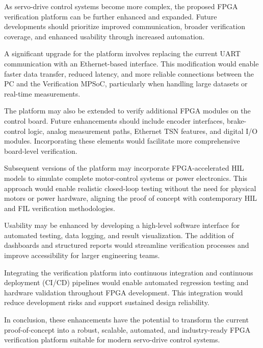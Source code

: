 As servo-drive control systems become more complex, the proposed \acs{FPGA} verification platform can be further enhanced and expanded. Future developments should prioritize improved communication, broader verification coverage, and enhanced usability through increased automation.

A significant upgrade for the platform involves replacing the current \acs{UART} communication with an Ethernet-based interface. This modification would enable faster data transfer, reduced latency, and more reliable connections between the PC and the Verification \acs{MPSoC}, particularly when handling large datasets or real-time measurements.

The platform may also be extended to verify additional \acs{FPGA} modules on the control board. Future enhancements should include encoder interfaces, brake-control logic, analog measurement paths, Ethernet \acs{TSN} features, and digital I/O modules. Incorporating these elements would facilitate more comprehensive board-level verification.

Subsequent versions of the platform may incorporate \acs{FPGA}-accelerated \acs{HIL} models to simulate complete motor-control systems or power electronics. This approach would enable realistic closed-loop testing without the need for physical motors or power hardware, aligning the proof of concept with contemporary \acs{HIL} and \acs{FIL} verification methodologies.

Usability may be enhanced by developing a high-level software interface for automated testing, data logging, and result visualization. The addition of dashboards and structured reports would streamline verification processes and improve accessibility for larger engineering teams.

Integrating the verification platform into continuous integration and continuous deployment (CI/CD) pipelines would enable automated regression testing and hardware validation throughout \acs{FPGA} development. This integration would reduce development risks and support sustained design reliability.

In conclusion, these enhancements have the potential to transform the current proof-of-concept into a robust, scalable, automated, and industry-ready \acs{FPGA} verification platform suitable for modern servo-drive control systems.

